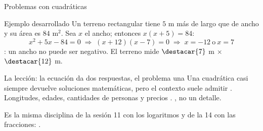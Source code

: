 \documentclass[aspectratio=169,10pt]{beamer}
\begin{document}
\begin{frame}{Problemas con cuadráticas}
  \scriptsize
  \begin{exampleblock}{Ejemplo desarrollado}
    \tiny
    Un terreno rectangular tiene $5$ m más de largo que de ancho y su área es
    $84$ m$^{2}$. Sea $x$ el ancho; entonces $x(x+5) = 84$:
    \[ x^{2}+5x-84 = 0
       \;\Longrightarrow\; (x+12)(x-7)=0
       \;\Longrightarrow\; x=-12 \ \text{o} \ x=7 \]
    : un ancho no puede ser negativo. El terreno
    mide $\destacar{7}$ m $\times$ $\destacar{12}$ m.
  \end{exampleblock}

  \vspace{0.02cm}
  \begin{alertblock}{La lección: la ecuación da dos respuestas, el problema una}
    \tiny
    Una cuadrática casi siempre devuelve  soluciones matemáticas,
    pero el contexto suele admitir . Longitudes, edades,
    cantidades de personas y precios .
    , no un
    detalle.
  \end{alertblock}

  \vspace{0.0cm}
  {\tiny\color{uniGris} Es la misma disciplina de la sesión 11 con los
  logaritmos y de la 14 con las fracciones: .}
\end{frame}

\end{document}
